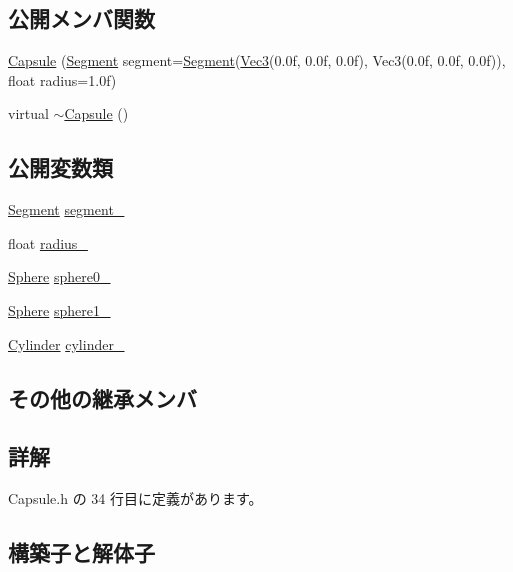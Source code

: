 \subsection*{公開メンバ関数}
\begin{DoxyCompactItemize}
\item 
\mbox{\hyperlink{class_capsule_aeef9aff581e55f6b091854c3ca9a8a8d}{Capsule}} (\mbox{\hyperlink{class_segment}{Segment}} segment=\mbox{\hyperlink{class_segment}{Segment}}(\mbox{\hyperlink{_vector3_d_8h_ab16f59e4393f29a01ec8b9bbbabbe65d}{Vec3}}(0.\+0f, 0.\+0f, 0.\+0f), Vec3(0.\+0f, 0.\+0f, 0.\+0f)), float radius=1.\+0f)
\item 
virtual \mbox{\hyperlink{class_capsule_abfd7f0348ce8e7f8ee4e70374ae27533}{$\sim$\+Capsule}} ()
\end{DoxyCompactItemize}
\subsection*{公開変数類}
\begin{DoxyCompactItemize}
\item 
\mbox{\hyperlink{class_segment}{Segment}} \mbox{\hyperlink{class_capsule_a9557489d45b8a343f58d815965be988c}{segment\+\_\+}}
\item 
float \mbox{\hyperlink{class_capsule_a5a479b152df710dba41b6529cf11199c}{radius\+\_\+}}
\item 
\mbox{\hyperlink{class_sphere}{Sphere}} \mbox{\hyperlink{class_capsule_a37c7db7fe8cb06be2f374d7aba24267e}{sphere0\+\_\+}}
\item 
\mbox{\hyperlink{class_sphere}{Sphere}} \mbox{\hyperlink{class_capsule_ac478efc95993a85908a7cd2759133ab2}{sphere1\+\_\+}}
\item 
\mbox{\hyperlink{class_cylinder}{Cylinder}} \mbox{\hyperlink{class_capsule_a7b7f46d36a0d810555aa5eb62da6a8ed}{cylinder\+\_\+}}
\end{DoxyCompactItemize}
\subsection*{その他の継承メンバ}


\subsection{詳解}


 Capsule.\+h の 34 行目に定義があります。



\subsection{構築子と解体子}
\mbox{\label{class_capsule_aeef9aff581e55f6b091854c3ca9a8a8d}} 
